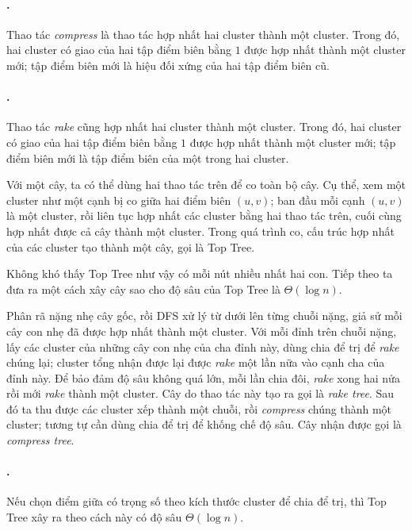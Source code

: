 \documentclass[11pt]{article}
\begin{document}
\paragraph{.}
Thao tác \emph{compress} là thao tác hợp nhất hai cluster thành một cluster.
Trong đó, hai cluster có giao của hai tập điểm biên bằng \(1\) được hợp nhất
thành một cluster mới; tập điểm biên mới là hiệu đối xứng của hai tập điểm biên
cũ.

\paragraph{.}
Thao tác \emph{rake} cũng hợp nhất hai cluster thành một cluster. Trong đó, hai
cluster có giao của hai tập điểm biên bằng \(1\) được hợp nhất thành một cluster
mới; tập điểm biên mới là tập điểm biên của một trong hai cluster.


Với một cây, ta có thể dùng hai thao tác trên để co toàn bộ cây. Cụ thể, xem
một cluster như một cạnh bị co giữa hai điểm biên \((u,v)\); ban đầu mỗi cạnh
\((u,v)\) là một cluster, rồi liên tục hợp nhất các cluster bằng hai thao tác
trên, cuối cùng hợp nhất được cả cây thành một cluster. Trong quá trình co, cấu
trúc hợp nhất của các cluster tạo thành một cây, gọi là Top Tree.

Không khó thấy Top Tree như vậy có mỗi nút nhiều nhất hai con. Tiếp theo ta đưa
ra một cách xây cây sao cho độ sâu của Top Tree là \(\Theta(\log n)\).

Phân rã nặng nhẹ cây gốc, rồi DFS xử lý từ dưới lên từng chuỗi nặng, giả sử mỗi
cây con nhẹ đã được hợp nhất thành một cluster. Với mỗi đỉnh trên chuỗi nặng,
lấy các cluster của những cây con nhẹ của cha đỉnh này, dùng chia để trị để
\emph{rake} chúng lại; cluster tổng nhận được lại được \emph{rake} một lần nữa
vào cạnh cha của đỉnh này. Để bảo đảm độ sâu không quá lớn, mỗi lần chia đôi,
\emph{rake} xong hai nửa rồi mới \emph{rake} thành một cluster. Cây do thao tác
này tạo ra gọi là \emph{rake tree}. Sau đó ta thu được các cluster xếp thành
một chuỗi, rồi \emph{compress} chúng thành một cluster; tương tự cần dùng chia
để trị để khống chế độ sâu. Cây nhận được gọi là \emph{compress tree}.


\paragraph{.}
Nếu chọn điểm giữa có trọng số theo kích thước cluster để chia để trị, thì Top
Tree xây ra theo cách này có độ sâu \(\Theta(\log n)\).
\end{document}
